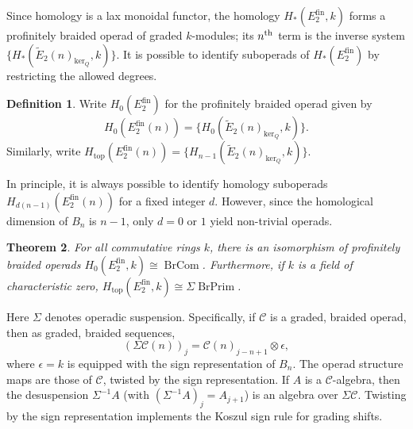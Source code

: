 \documentclass[12pt]{article}
\DeclareMathOperator{\fin}{fin}
\DeclareMathOperator{\topp}{top}
\DeclareMathOperator{\BrPrim}{BrPrim}
\DeclareMathOperator{\BrCom}{BrCom}
\newcommand{\CC} {\mathcal{C}}
\newcommand{\Ct} {\widetilde{E}}
\newcommand{\nth}{\textsuperscript{th}}
\theoremstyle{plain}
\newtheorem{thm}{Theorem}[section]
\theoremstyle{definition}
\newtheorem{defn}[thm]{Definition}
\theoremstyle{remark}
\begin{document}
Since homology is a lax monoidal functor, the homology $H_*(E_2^{\fin}, k)$ forms a profinitely braided operad of graded $k$-modules; its $n\nth$ term is the inverse system $\{H_*(\Ct_2(n)_{\ker_Q}, k)\}$.  It is possible to identify suboperads of $H_*(E_2^{\fin})$ by restricting the allowed degrees.  

\begin{defn} Write $H_0(E_2^{\fin})$ for the profinitely braided operad given by 
%
$$H_0(E_2^{\fin}(n)) = \{H_0(\Ct_2(n)_{\ker_Q}, k)\}.$$
%
Similarly, write $H_{\topp}(E_2^{\fin}(n)) =  \{H_{n-1} (\Ct_2(n)_{\ker_Q}, k)\}$. \end{defn}

In principle, it is always possible to identify homology suboperads $H_{d(n-1)}(E_2^{\fin}(n))$ for a fixed integer $d$.  However, since the homological dimension of $B_n$ is $n-1$, only $d=0$ or $1$ yield non-trivial operads.

\begin{thm}

For all commutative rings $k$, there is an isomorphism of profinitely braided operads $H_0(E_2^{\fin}, k) \cong \BrCom$.  Furthermore, if $k$ is a field of characteristic zero, $H_{\topp}(E_2^{\fin}, k)\cong \Sigma \BrPrim$.

\end{thm}

Here $\Sigma$ denotes operadic suspension.  Specifically, if $\CC$ is a graded, braided operad, then as graded, braided sequences,
%
$$(\Sigma\CC(n))_j = \CC(n)_{j-n+1} \otimes \epsilon,$$
%
where $\epsilon = k$ is equipped with the sign representation of $B_n$.  The operad structure maps are those of $\CC$, twisted by the sign representation.  If $A$ is a $\CC$-algebra, then the desuspension $\Sigma^{-1} A$ (with $(\Sigma^{-1}A)_j = A_{j+1}$) is an algebra over $\Sigma \CC$.  Twisting by the sign representation implements the Koszul sign rule for grading shifts.
\end{document}
